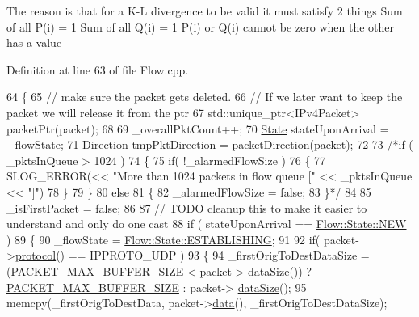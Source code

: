 The reason is that for a K-\/\-L divergence to be valid it must satisfy 2 things Sum of all P(i) = 1 Sum of all Q(i) = 1 P(i) or Q(i) cannot be zero when the other has a value

Definition at line 63 of file Flow.\-cpp.


\begin{DoxyCode}
64 \{
65     \textcolor{comment}{// make sure the packet gets deleted.}
66     \textcolor{comment}{// If we later want to keep the packet we will release it from the ptr}
67     std::unique\_ptr<IPv4Packet> packetPtr(packet);
68 
69     \_overallPktCount++;
70     \hyperlink{class_vsid_common_1_1_flow_a4c78d7517903031a861c7287e706a6c2}{State} stateUponArrival = \_flowState;
71     \hyperlink{class_vsid_common_1_1_flow_a82b0cd313a915325b97133fd8e104781}{Direction} tmpPktDirection = \hyperlink{class_vsid_common_1_1_flow_a8708e13cea69ad630274901ec94b5cf4}{packetDirection}(packet);
72 
73     \textcolor{comment}{/*if ( \_pktsInQueue > 1024 )}
74 \textcolor{comment}{    \{}
75 \textcolor{comment}{        if( !\_alarmedFlowSize )}
76 \textcolor{comment}{        \{}
77 \textcolor{comment}{            SLOG\_ERROR(<< "More than 1024 packets in flow queue [" << \_pktsInQueue << "]")}
78 \textcolor{comment}{        \}}
79 \textcolor{comment}{    \}}
80 \textcolor{comment}{    else}
81 \textcolor{comment}{    \{}
82 \textcolor{comment}{        \_alarmedFlowSize = false;}
83 \textcolor{comment}{    \}*/}
84 
85     \_isFirstPacket = \textcolor{keyword}{false};
86 
87     \textcolor{comment}{// TODO cleanup this to make it easier to understand and only do one cast}
88     \textcolor{keywordflow}{if} ( stateUponArrival == \hyperlink{class_vsid_common_1_1_flow_a4c78d7517903031a861c7287e706a6c2a24d459a81449d7210c8f9a86c2913034}{Flow::State::NEW} )
89     \{
90         \_flowState = \hyperlink{class_vsid_common_1_1_flow_a4c78d7517903031a861c7287e706a6c2afdb7bfdb2e03442a306fe07f152f91fc}{Flow::State::ESTABLISHING};
91 
92         \textcolor{keywordflow}{if}( packet->\hyperlink{class_vsid_common_1_1_i_pv4_packet_ac1ff979633726d9f558bce1210595879}{protocol}() == IPPROTO\_UDP )
93         \{
94             \_firstOrigToDestDataSize = (\hyperlink{_flow_8h_a3850e13d81280c9383e0b2a20eaebaeb}{PACKET\_MAX\_BUFFER\_SIZE} < packet->
      \hyperlink{class_vsid_common_1_1_i_pv4_packet_a39fe36210895625ee87320f5c0c7f52e}{dataSize}()) ? \hyperlink{_flow_8h_a3850e13d81280c9383e0b2a20eaebaeb}{PACKET\_MAX\_BUFFER\_SIZE} : packet->
      \hyperlink{class_vsid_common_1_1_i_pv4_packet_a39fe36210895625ee87320f5c0c7f52e}{dataSize}();
95             memcpy(\_firstOrigToDestData, packet->\hyperlink{class_vsid_common_1_1_i_pv4_packet_a9fb8c763d740e193a68c55604a8a7bd6}{data}(), \_firstOrigToDestDataSize);

\end{DoxyCode}
